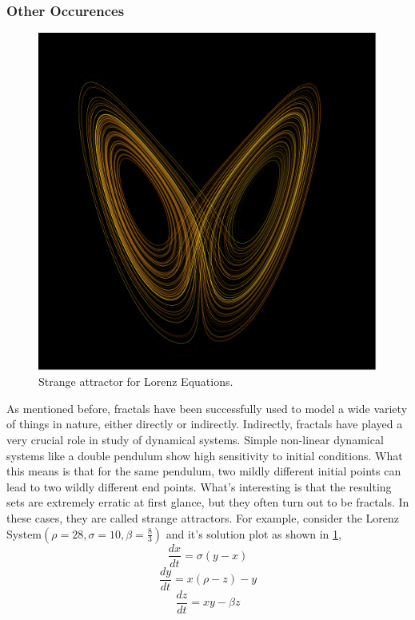 \subsubsection{Other Occurences}
\begin{figure}[h!]
    \includegraphics[width=\linewidth]{Pictures/strange_attractor.png}
    \caption{Strange attractor for Lorenz Equations.}
    \label{fig:strange_attractor}
\end{figure}
As mentioned before, fractals have been successfully used to model a wide
variety of things in nature, either directly or indirectly. Indirectly, fractals
have played a very crucial role in study of dynamical systems. Simple non-linear
dynamical systems like a double pendulum show high sensitivity to initial
conditions. What this means is that for the same pendulum, two mildly different
initial points can lead to two wildly different end points. What's interesting
is that the resulting sets are extremely erratic at first glance, but they often
turn out to be fractals. In these cases, they are called strange
attractors.\cite{strogatz}
For example, consider the Lorenz System$(\rho = 28, \sigma =10,
\beta=\frac{8}{3})$ and it's solution plot as shown in
\ref{fig:strange_attractor},
\[
    \frac{dx}{dt} = \sigma(y - x)
\]
\[
    \frac{dy}{dt} = x(\rho -z) - y
\]
\[
    \frac{dz}{dt} = xy - \beta z
\]

